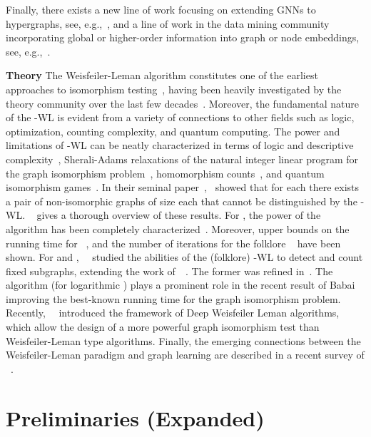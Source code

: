 \documentclass{article}
\newcommand{\xhdr}[1]{{\noindent\bfseries #1}}
\theoremstyle{definition}
\newcommand{\kwl}{-\textsf{WL}\xspace}
\begin{document}
Finally, there exists a new line of work focusing on extending GNNs to hypergraphs, see, e.g.,~\cite{Bai+2019,Yad+2019,Zha+2019}, and a line of work in the data mining community incorporating global or higher-order information into graph or node embeddings, see, e.g.,~\cite{Cao+2015,Lee+2019,Cha+2018}.



\xhdr{Theory}
The Weisfeiler-Leman algorithm constitutes one of the earliest approaches to isomorphism testing~\cite{Wei+1976,Wei+1968}, having been heavily investigated by the theory community over the last few decades~\cite{Gro+2014}. Moreover, the fundamental nature of the \kwl is evident from a variety of connections to other fields such as logic, optimization, counting complexity, and quantum computing. The power and limitations of -WL can be neatly characterized in terms of logic and descriptive complexity~\cite{Imm+1990}, Sherali-Adams relaxations of the natural integer linear program for the graph isomorphism problem~\cite{Ast+2013,GroheO15,Mal2014}, homomorphism counts~\cite{Del+2018}, and quantum isomorphism games~\cite{Ats+2019}. In their seminal paper~\cite{Imm+1990},~\citeauthor{Cai+1992} showed that for each  there exists a pair of non-isomorphic graphs of size  each that cannot be distinguished by the \kwl. \citeauthor{Gro+2014}~\cite{Gro+2014} gives a thorough overview of these results. For , the power of the algorithm has been completely characterized~\cite{Arv+2015,Kie+2015}.  Moreover, upper bounds on the running time for ~\cite{Ber+2013,Kie+2020}, and the number of iterations for the folklore ~\cite{Kie+2016,Lic+2019} have been shown. For  and ,~\citeauthor{Arv+2019}~\cite{Arv+2019} studied the abilities of the (folklore) \kwl to detect and count fixed subgraphs, extending the work of~\citeauthor{Fue+2017}~\cite{Fue+2017}. The former was refined in~\cite{Che+2020a}. The algorithm (for logarithmic ) plays a prominent role in the recent result of Babai~\cite{Bab+2016} improving the best-known running time for the graph isomorphism problem. Recently,~\citeauthor{Gro+2020a}~\cite{Gro+2020a} introduced the framework of Deep Weisfeiler Leman algorithms, which allow the design of a more powerful graph isomorphism test than Weisfeiler-Leman type algorithms. Finally, the emerging connections between the Weisfeiler-Leman paradigm and graph learning are described in a recent survey of \citeauthor{Gro+2020}~\cite{Gro+2020}. 


\section{Preliminaries (Expanded)}\label{prelim}
\end{document}
